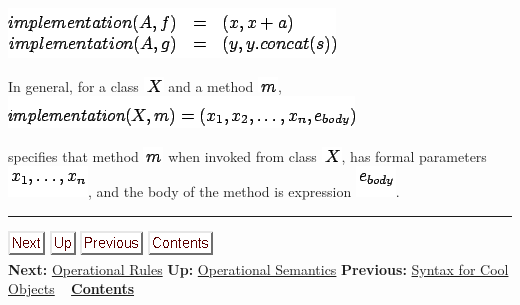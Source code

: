 \documentclass[]{article}
\begin{document}
\includegraphics{img150.png}

In general, for a class \includegraphics{img141.png} and a method
\includegraphics{img151.png}, \\

\includegraphics{img152.png}

specifies that method \includegraphics{img151.png} when invoked from
class \includegraphics{img141.png}, has formal parameters
\includegraphics{img153.png}, and the body of the method is expression
\includegraphics{img154.png}.

\begin{center}\rule{3in}{0.4pt}\end{center}

\href{node48.html}{\includegraphics{next.png}}
\href{node44.html}{\includegraphics{up.png}}
\href{node46.html}{\includegraphics{prev.png}}
\href{node1.html}{\includegraphics{contents.png}} \\ \textbf{Next:}
\href{node48.html}{Operational Rules} \textbf{Up:}
\href{node44.html}{Operational Semantics} \textbf{Previous:}
\href{node46.html}{Syntax for Cool Objects} ~
\textbf{\href{node1.html}{Contents}}
\end{document}
